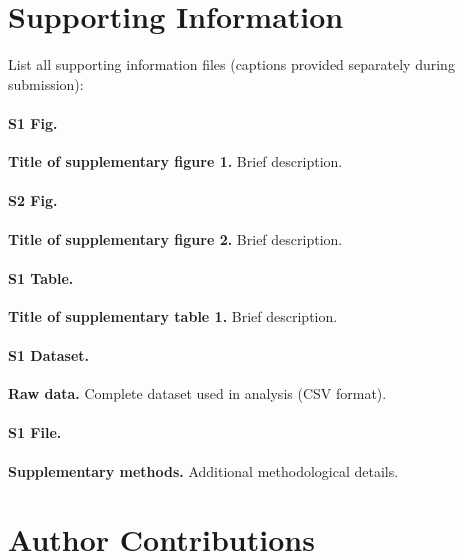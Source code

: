 \documentclass[10pt,letterpaper]{article}
\begin{document}
\section*{Supporting Information}

List all supporting information files (captions provided separately during submission):

\paragraph{S1 Fig.}
\textbf{Title of supplementary figure 1.} Brief description.

\paragraph{S2 Fig.}
\textbf{Title of supplementary figure 2.} Brief description.

\paragraph{S1 Table.}
\textbf{Title of supplementary table 1.} Brief description.

\paragraph{S1 Dataset.}
\textbf{Raw data.} Complete dataset used in analysis (CSV format).

\paragraph{S1 File.}
\textbf{Supplementary methods.} Additional methodological details.

\section*{Author Contributions}
\end{document}
